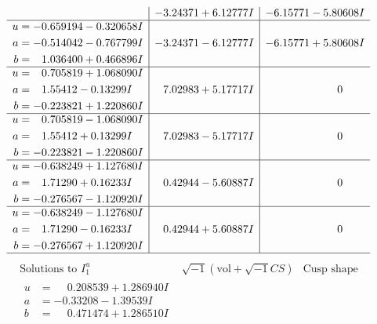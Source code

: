 \documentclass[1p]{elsarticle_modified}
\theoremstyle{definition}
\newcommand{\I}{\sqrt{-1}}
\begin{document}
$$\begin{array}{c|c|c}
 & -3.24371 + 6.12777 I & -6.15771 - 5.80608 I \\ \hline\begin{aligned}
u &= -0.659194 - 0.320658 I \\
a &= -0.514042 - 0.767799 I \\
b &= \phantom{-}1.036400 + 0.466896 I\end{aligned}
 & -3.24371 - 6.12777 I & -6.15771 + 5.80608 I \\ \hline\begin{aligned}
u &= \phantom{-}0.705819 + 1.068090 I \\
a &= \phantom{-}1.55412 - 0.13299 I \\
b &= -0.223821 + 1.220860 I\end{aligned}
 & \phantom{-}7.02983 + 5.17717 I & \phantom{-0.000000 } 0 \\ \hline\begin{aligned}
u &= \phantom{-}0.705819 - 1.068090 I \\
a &= \phantom{-}1.55412 + 0.13299 I \\
b &= -0.223821 - 1.220860 I\end{aligned}
 & \phantom{-}7.02983 - 5.17717 I & \phantom{-0.000000 } 0 \\ \hline\begin{aligned}
u &= -0.638249 + 1.127680 I \\
a &= \phantom{-}1.71290 + 0.16233 I \\
b &= -0.276567 - 1.120920 I\end{aligned}
 & \phantom{-}0.42944 - 5.60887 I & \phantom{-0.000000 } 0 \\ \hline\begin{aligned}
u &= -0.638249 - 1.127680 I \\
a &= \phantom{-}1.71290 - 0.16233 I \\
b &= -0.276567 + 1.120920 I\end{aligned}
 & \phantom{-}0.42944 + 5.60887 I & \phantom{-0.000000 } 0\\
 \hline 
 \end{array}$$\newpage$$\begin{array}{c|c|c}  
\text{Solutions to }I^u_{1}& \I (\text{vol} + \sqrt{-1}CS) & \text{Cusp shape}\\
 \hline 
\begin{aligned}
u &= \phantom{-}0.208539 + 1.286940 I \\
a &= -0.33208 - 1.39539 I \\
b &= \phantom{-}0.471474 + 1.286510 I\end{aligned}

\end{array}$$
\end{document}

